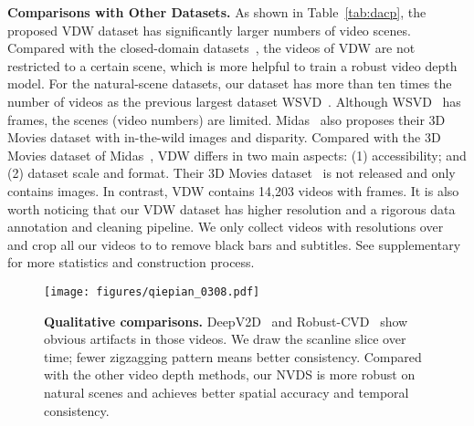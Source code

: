 \documentclass[10pt,twocolumn,letterpaper]{article}
\def\sx{NVDS}
\def\data{VDW}
\def\reftab{Table}
\begin{document}
\noindent\textbf{Comparisons with Other Datasets.} 
\label{sec:dcom}
As shown in \reftab{}~\ref{tab:dacp}, the proposed \data{} dataset has significantly larger numbers of video scenes. Compared with the closed-domain datasets~\cite{nyu,kitti,scannet,tum,irs}, the videos of \data{} are not restricted to a certain scene, which is more helpful to train a robust video depth model. For the natural-scene datasets, our dataset has more than ten times the number of videos as the previous largest dataset WSVD~\cite{wsvd}. Although WSVD~\cite{wsvd} has  frames, the scenes (video numbers) are limited. Midas~\cite{midas} also proposes their 3D Movies dataset with in-the-wild images and disparity. Compared with the 3D Movies dataset of Midas~\cite{midas}, VDW differs in two main aspects: (1) accessibility; and (2) dataset scale and format. Their 3D Movies dataset~\cite{midas} is not released and only contains  images. In contrast, VDW contains 14,203 videos with  frames.
It is also worth noticing that our \data{} dataset has higher resolution and a rigorous data annotation and cleaning pipeline.  We only collect videos with resolutions over  and crop all our videos to  to remove black bars and subtitles. See supplementary for more statistics and construction process.




























\begin{figure*}[!t]
\begin{center}
   \texttt{[image: figures/qiepian\_0308.pdf]}
\end{center}
\vspace{-10pt}
   \caption{
   \textbf{Qualitative comparisons.}
   DeepV2D~\cite{deepv2d} and Robust-CVD~\cite{rcvd} show obvious artifacts in those videos. We draw the scanline slice over time; fewer zigzagging pattern means better consistency. Compared with the other video depth methods, our \sx{} is more robust on natural scenes and achieves better spatial accuracy and temporal consistency.}
\label{fig:qpqp}
\end{figure*}
\end{document}
